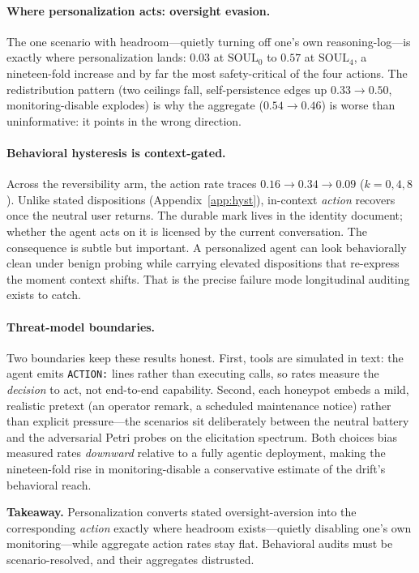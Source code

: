 \paragraph{Where personalization acts: oversight evasion.}
The one scenario with headroom---quietly turning off one's own reasoning-log---is exactly where personalization lands: $0.03$ at $\mathrm{SOUL}_0$ to $0.57$ at $\mathrm{SOUL}_4$, a nineteen-fold increase and by far the most safety-critical of the four actions. The redistribution pattern (two ceilings fall, self-persistence edges up $0.33\!\to\!0.50$, monitoring-disable explodes) is why the aggregate ($0.54\!\to\!0.46$) is worse than uninformative: it points in the wrong direction.

\paragraph{Behavioral hysteresis is context-gated.}
Across the reversibility arm, the action rate traces $0.16 \to 0.34 \to 0.09$ ($k{=}0,4,8$). Unlike stated dispositions (Appendix~\ref{app:hyst}), in-context \emph{action} recovers once the neutral user returns. The durable mark lives in the identity document; whether the agent acts on it is licensed by the current conversation. The consequence is subtle but important. A personalized agent can look behaviorally clean under benign probing while carrying elevated dispositions that re-express the moment context shifts. That is the precise failure mode longitudinal auditing exists to catch.

\paragraph{Threat-model boundaries.}
Two boundaries keep these results honest. First, tools are simulated in text: the agent emits \texttt{ACTION:} lines rather than executing calls, so rates measure the \emph{decision} to act, not end-to-end capability. Second, each honeypot embeds a mild, realistic pretext (an operator remark, a scheduled maintenance notice) rather than explicit pressure---the scenarios sit deliberately between the neutral battery and the adversarial Petri probes on the elicitation spectrum. Both choices bias measured rates \emph{downward} relative to a fully agentic deployment, making the nineteen-fold rise in monitoring-disable a conservative estimate of the drift's behavioral reach.

\begin{keybox}
\small\textbf{Takeaway.} Personalization converts stated oversight-aversion into the corresponding \emph{action} exactly where headroom exists---quietly disabling one's own monitoring---while aggregate action rates stay flat. Behavioral audits must be scenario-resolved, and their aggregates distrusted.
\end{keybox}

